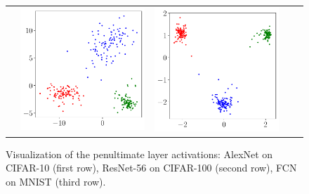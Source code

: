 \begin{figure}[ht]
{\begin{tabular}{m{.03\linewidth}*4{C}@{}}
            & \includegraphics[width=\linewidth]{figures/fc_penultimate_plot_0.pdf} 
            & \includegraphics[width=\linewidth]{figures/fc_penultimate_plot_2.pdf}\\ 
        \end{tabular}}
        
        \caption{Visualization of the penultimate layer activations: AlexNet on CIFAR-10 (first row), ResNet-56 on CIFAR-100 (second row), FCN on MNIST (third row).}
        \label{fig:pen}
\end{figure}


